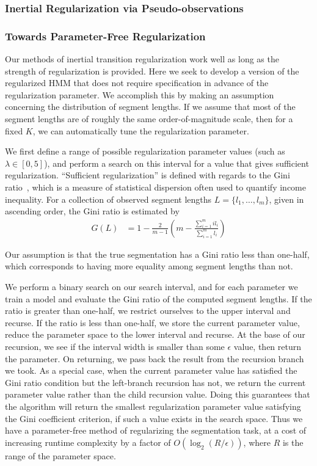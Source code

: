\documentclass[12pt]{article}
\begin{document}
\subsubsection{Inertial Regularization via Pseudo-observations}



\subsubsection{Towards Parameter-Free Regularization}\label{sec:param-free}

Our methods of inertial transition regularization work well as long as the strength of regularization is provided. Here we seek to develop a version of the regularized HMM that does not require specification in advance of the regularization parameter. We accomplish this by making an assumption concerning the distribution of segment lengths. If we assume that most of the segment lengths are of roughly the same order-of-magnitude scale, then for a fixed $K$, we can automatically tune the regularization parameter.

We first define a range of possible regularization parameter values (such as $\lambda \in [0, 5]$), and perform a search on this interval for a value that gives sufficient regularization. ``Sufficient regularization'' is defined with regards to the Gini ratio~\cite{gini1936,wiki:1}, which is a measure of statistical dispersion often used to quantify income inequality. For a collection of observed segment lengths $L = \{l_1, \ldots, l_m\}$, given in ascending order, the Gini ratio is estimated by
\begin{align*}
    G(L) &= 1 - \frac{2}{m-1}\left(m - \frac{\sum_{i=1}^{m} i l_i}{\sum_{i=1}^{m} l_i}\right)
\end{align*}

Our assumption is that the true segmentation has a Gini ratio less than one-half, which corresponds to having more equality among segment lengths than not. 

We perform a binary search on our search interval, and for each parameter we train a model and evaluate the Gini ratio of the computed segment lengths. If the ratio is greater than one-half, we restrict ourselves to the upper interval and recurse. If the ratio is less than one-half, we store the current parameter value, reduce the parameter space to the lower interval and recurse. At the base of our recursion, we see if the interval width is smaller than some $\epsilon$ value, then return the parameter. On returning, we pass back the result from the recursion branch we took. As a special case, when the current parameter value has satisfied the Gini ratio condition but the left-branch recursion has not, we return the current parameter value rather than the child recursion value. Doing this guarantees that the algorithm will return the smallest regularization parameter value satisfying the Gini coefficient criterion, if such a value exists in the search space. Thus we have a parameter-free method of regularizing the segmentation task, at a cost of increasing runtime complexity by a factor of $O(\log_2 (R / \epsilon))$, where $R$ is the range of the parameter space.
\end{document}
